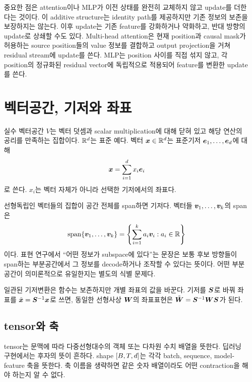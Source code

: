중요한 점은 attention이나 MLP가 이전 상태를 완전히 교체하지 않고 update를 더한다는 것이다.
이 additive structure는 identity path를 제공하지만 기존 정보의 보존을 보장하지는 않는다.
이후 update는 기존 feature를 강화하거나 약화하고, 반대 방향의 update로 상쇄할 수도 있다.
Multi-head attention은 현재 position과 causal mask가 허용하는 source position들의 value 정보를 결합하고 output projection을 거쳐 residual stream에 update를 쓴다.
MLP는 position 사이를 직접 섞지 않고, 각 position의 정규화된 residual vector에 독립적으로 적용되어 feature를 변환한 update를 쓴다.

\section{벡터공간, 기저와 좌표}

실수 벡터공간 $V$는 벡터 덧셈과 scalar multiplication에 대해 닫혀 있고 해당 연산의 공리를 만족하는 집합이다.
$\mathbb{R}^d$는 표준 예다.
벡터 $\bm{x}\in\mathbb{R}^d$는 표준기저 $\bm{e}_1,\ldots,\bm{e}_d$에 대해
\begin{equation}
  \bm{x}=\sum_{i=1}^{d}x_i\bm{e}_i
\end{equation}
로 쓴다.
$x_i$는 벡터 자체가 아니라 선택한 기저에서의 좌표다.

선형독립인 벡터들의 집합이 공간 전체를 span하면 기저다.
벡터들 $\bm{v}_1,\ldots,\bm{v}_k$의 span은
\begin{equation}
  \operatorname{span}\{\bm{v}_1,\ldots,\bm{v}_k\}
  =\left\{\sum_{i=1}^k a_i\bm{v}_i:a_i\in\mathbb{R}\right\}
\end{equation}
이다.
표현 연구에서 ``어떤 정보가 subspace에 있다''는 문장은 보통 후보 방향들이 span하는 부분공간에서 그 정보를 decode하거나 조작할 수 있다는 뜻이다.
어떤 부분공간이 의미론적으로 유일한지는 별도의 식별 문제다.

일관된 기저변환은 함수는 보존하지만 개별 좌표의 값을 바꾼다.
기저를 $\bm{S}$로 바꿔 좌표를 $\tilde{\bm{x}}=\bm{S}^{-1}\bm{x}$로 쓰면, 동일한 선형사상 $\bm{W}$의 좌표표현은 $\tilde{\bm{W}}=\bm{S}^{-1}\bm{W}\bm{S}$가 된다.

\subsection{tensor와 축}

tensor는 문맥에 따라 다중선형대수의 객체 또는 다차원 수치 배열을 뜻한다.
딥러닝 구현에서는 후자의 뜻이 흔하다.
shape $\left[B,T,d\right]$는 각각 batch, sequence, model-feature 축을 뜻한다.
축 이름을 생략하면 같은 숫자 배열이라도 어떤 contraction을 해야 하는지 알 수 없다.

